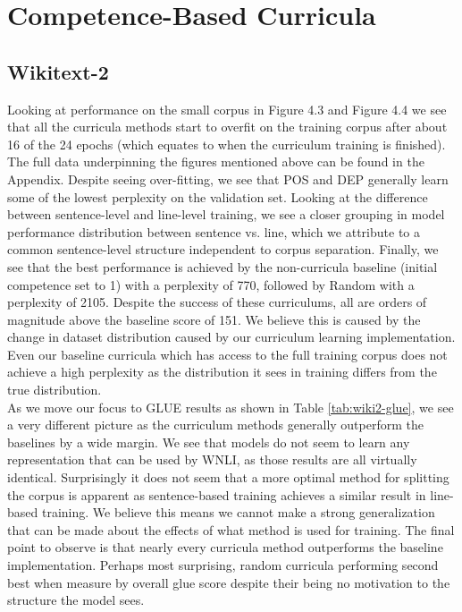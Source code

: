 \section{Competence-Based Curricula}
\subsection{Wikitext-2}
Looking at performance on the small corpus in Figure 4.3 and Figure 4.4 we see that all the curricula methods start to overfit on the training corpus after about 16 of the 24 epochs (which equates to when the curriculum training is finished). The full data underpinning the figures mentioned above can be found in the Appendix. Despite seeing over-fitting, we see that POS and DEP generally learn some of the lowest perplexity on the validation set. Looking at the difference between sentence-level and line-level training, we see a closer grouping in model performance distribution between sentence vs. line, which we attribute to a common sentence-level structure independent to corpus separation. Finally, we see that the best performance is achieved by the non-curricula baseline (initial competence set to 1) with a perplexity of 770, followed by Random with a perplexity of 2105. Despite the success of these curriculums, all are orders of magnitude above the baseline score of 151. We believe this is caused by the change in dataset distribution caused by our curriculum learning implementation. Even our baseline curricula which has access to the full training corpus does not achieve a high perplexity as the distribution it sees in training differs from the true distribution. \\
As we move our focus to GLUE results as shown in Table \ref{tab:wiki2-glue}, we see a very different picture as the curriculum methods generally outperform the baselines by a wide margin. We see that models do not seem to learn any representation that can be used by WNLI, as those results are all virtually identical. Surprisingly it does not seem that a more optimal method for splitting the corpus is apparent as sentence-based training achieves a similar result in line-based training. We believe this means we cannot make a strong generalization that can be made about the effects of what method is used for training. The final point to observe is that nearly every curricula method outperforms the baseline implementation. Perhaps most surprising, random curricula performing second best when measure by overall glue score despite their being no motivation to the structure the model sees. \\

